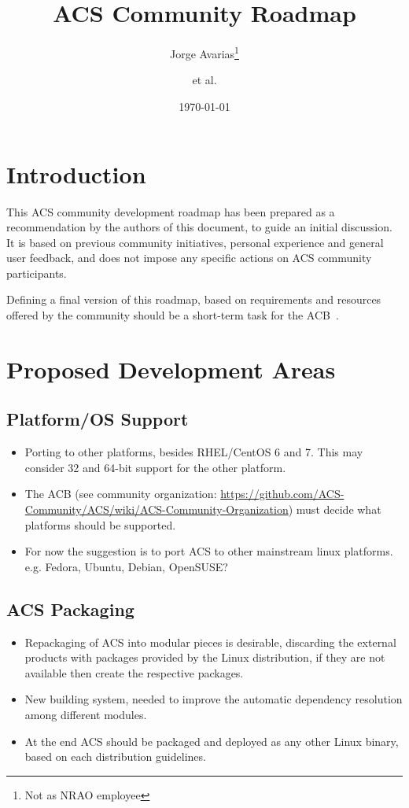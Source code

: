 \documentclass[letterpaper,11pt,twosided]{article}
\title{ACS Community Roadmap}
\date{\today}
\author{Jorge Avarias\thanks{Not as NRAO employee} \and et al.}
\begin{document}
\maketitle


\section{Introduction}

This ACS community development roadmap has been prepared as a recommendation by the authors of this document, to guide an initial discussion. It is based on previous community initiatives, personal experience and general user feedback, and does not impose any specific actions on ACS community participants.

Defining a final version of this roadmap, based on requirements and resources offered by the community should be a short-term task for the ACB~\cite{acscb-acb}.

\section{Proposed Development Areas}
\label{sec:dev-areas}

\subsection{Platform/OS Support}
\begin{itemize}
\item Porting to other platforms, besides RHEL/CentOS 6 and 7. This may consider 32 and 64-bit support for the other platform.
\item The ACB (see community organization: \url{https://github.com/ACS-Community/ACS/wiki/ACS-Community-Organization}) must decide what platforms should be supported.
\item For now the suggestion is to port ACS to other mainstream linux platforms. e.g. Fedora, Ubuntu, Debian, OpenSUSE?
\end{itemize}


\subsection{ACS Packaging}
\begin{itemize}
\item Repackaging of ACS into modular pieces is desirable, discarding the external products with packages provided by the Linux distribution, if they are not available then create the respective packages.
\item New building system, needed to improve the automatic dependency resolution among different modules.
\item At the end ACS should be packaged and deployed as any other Linux binary, based on each distribution guidelines.
\end{itemize}
\end{document}
